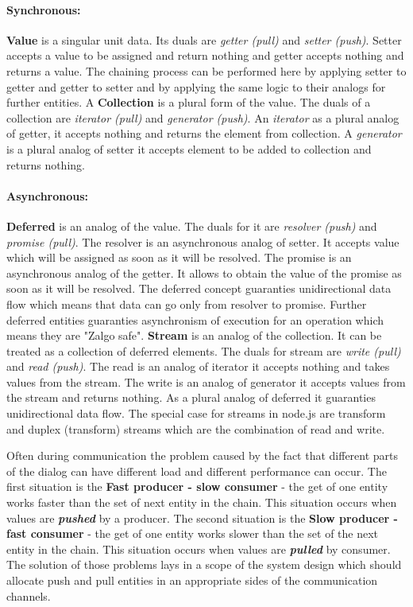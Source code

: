 \paragraph{Synchronous:} \textbf{Value} is a singular unit data. Its duals are \textit{getter (pull)} and \textit{setter (push)}. Setter accepts a value to be assigned and return nothing and getter accepts nothing and returns a value. The chaining process  can be performed here by applying setter to getter and getter to setter and by applying the same logic to their analogs for further  entities. A \textbf{Collection} is a plural form of the value. The duals of a collection are \textit{iterator (pull)} and \textit{generator (push)}. An \textit{iterator }as a plural analog of getter, it accepts nothing and returns the element from collection. A \textit{generator} is a plural analog of setter it accepts element to be added to collection and returns nothing.

\paragraph{Asynchronous:} \textbf{Deferred} is an analog of the value. The duals for it are \textit{resolver (push)} and \textit{promise (pull)}. The resolver is an asynchronous analog of setter. It  accepts value which will be assigned as soon as it will be resolved. The promise is an asynchronous analog of the getter. It allows to obtain the value of the promise as soon as it will be resolved. The deferred concept guaranties unidirectional data flow which means that data can go only from resolver to promise. Further deferred entities guaranties asynchronism of execution for an operation which means they are "Zalgo safe"\cite{asyncPerformance}. \textbf{Stream} is an analog of the collection. It can be treated as a collection of deferred elements. The duals for stream are \textit{write (pull)} and \textit{read (push)}. The read is an analog of iterator it accepts nothing and takes values from the stream. The write is an analog of generator it accepts values from the stream and returns nothing. As a plural analog of deferred it guaranties unidirectional data flow.  The special case for streams in node.js are transform and duplex (transform) streams which are the combination of read and write.

Often during communication the problem caused by the fact that different parts of the dialog can have different load and different performance can occur. The first situation is the \textbf{Fast producer - slow consumer} - the get of one entity works faster than the set of next entity in the chain. This situation occurs when values are \textbf{\textit{pushed}} by a producer. The second situation is the  \textbf{Slow producer - fast consumer} - the get of one entity works slower than the  set of the next entity in the chain. This situation occurs when values are \textbf{\textit{pulled}} by consumer. The solution of  those problems lays in a scope of the system design which should allocate push and pull entities in an appropriate sides of the communication channels.


